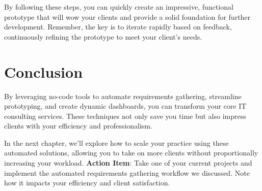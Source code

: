 By following these steps, you can quickly create an impressive, functional prototype that will wow your clients and provide a solid foundation for further development. Remember, the key is to iterate rapidly based on feedback, continuously refining the prototype to meet your client's needs.

\section{Conclusion}

By leveraging no-code tools to automate requirements gathering, streamline prototyping, and create dynamic dashboards, you can transform your core IT consulting services. These techniques not only save you time but also impress clients with your efficiency and professionalism.

In the next chapter, we'll explore how to scale your practice using these automated solutions, allowing you to take on more clients without proportionally increasing your workload.
%
\textbf{Action Item}: Take one of your current projects and implement the automated requirements gathering workflow we discussed. Note how it impacts your efficiency and client satisfaction.


